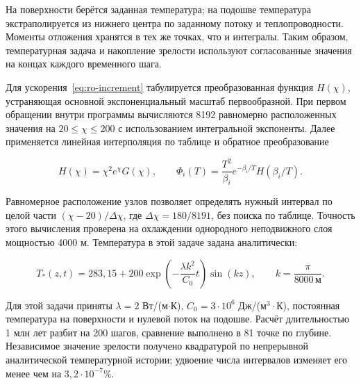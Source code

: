 На поверхности берётся заданная температура; на подошве температура
экстраполируется из нижнего центра по заданному потоку и теплопроводности.
Моменты отложения хранятся в тех же точках, что и интегралы.
Таким образом, температурная задача и накопление зрелости используют
согласованные значения на концах каждого временного шага.

Для ускорения~\eqref{eq:ro-increment} табулируется преобразованная
функция $H(\chi)$, устраняющая основной экспоненциальный масштаб
первообразной. При первом обращении внутри программы вычисляются
8192 равномерно расположенных значения на $20\leq\chi\leq200$
с использованием интегральной экспоненты. Далее применяется линейная
интерполяция по таблице и обратное преобразование

\begin{equation}
 H(\chi)=\chi^2e^\chi G(\chi),\qquad
 \Phi_i(T)=\frac{T^2}{\beta_i}e^{-\beta_i/T}H(\beta_i/T).
\end{equation}

Равномерное расположение узлов позволяет определять нужный интервал
по целой части $(\chi-20)/\Delta\chi$, где
$\Delta\chi=180/8191$, без поиска по таблице.
Точность этого вычисления проверена на охлаждении однородного
неподвижного слоя мощностью 4000 м. Температура в этой задаче
задана аналитически:

\begin{equation}
 T_*(z,t)=283{,}15+200\exp\!\left(-\frac{\lambda k^2}{C_0}t\right)\sin(kz),
 \qquad k=\frac{\pi}{8000\,\text{м}}.
\end{equation}

Для этой задачи приняты $\lambda=2$ Вт/(м$\cdot$К),
$C_0=3\cdot10^6$ Дж/(м$^3\cdot$К), постоянная температура
на поверхности и нулевой поток на подошве. Расчёт длительностью
1 млн лет разбит на 200 шагов, сравнение выполнено в 81 точке
по глубине. Независимое значение зрелости получено квадратурой
по непрерывной аналитической температурной истории; удвоение числа
интервалов изменяет его менее чем на $3{,}2\cdot10^{-7}\%$.

